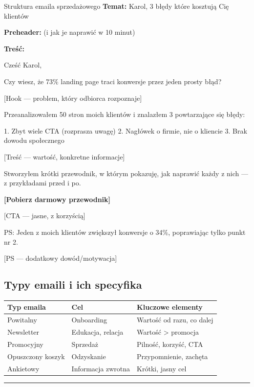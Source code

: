 \documentclass[
  12pt,
  a4paper,
  twoside,
  openright,
  12pt,
  DIV=12,
  BCOR=12mm]{scrbook}
\newcommand{\decoline}{%
  \begin{center}
    \textcolor{bordergray}{\rule{0.3\textwidth}{0.5pt}}
  \end{center}
}
\begin{document}
\begin{przyklad}{Struktura emaila sprzedażowego}
\textbf{Temat:} Karol, 3 błędy które kosztują Cię klientów

\textbf{Preheader:} (i jak je naprawić w 10 minut)

\textbf{Treść:}

Cześć Karol,

Czy wiesz, że 73\% landing page traci konwersje przez jeden prosty błąd?

[Hook --- problem, który odbiorca rozpoznaje]

Przeanalizowałem 50 stron moich klientów i znalazłem 3 powtarzające się błędy:

1. Zbyt wiele CTA (rozprasza uwagę)
2. Nagłówek o firmie, nie o kliencie
3. Brak dowodu społecznego

[Treść --- wartość, konkretne informacje]

Stworzyłem krótki przewodnik, w którym pokazuję, jak naprawić każdy z nich --- z przykładami przed i po.

\textbf{[Pobierz darmowy przewodnik]}

[CTA --- jasne, z korzyścią]

PS: Jeden z moich klientów zwiększył konwersje o 34\%, poprawiając tylko punkt nr 2.

[PS --- dodatkowy dowód/motywacja]
\end{przyklad}

\subsection{Typy emaili i ich
specyfika}\label{typy-emaili-i-ich-specyfika}

\begin{longtable}[]{@{}lll@{}}
\toprule\noalign{}
Typ emaila & Cel & Kluczowe elementy \\
\midrule\noalign{}
\endhead
\bottomrule\noalign{}
\endlastfoot
Powitalny & Onboarding & Wartość od razu, co dalej \\
Newsletter & Edukacja, relacja & Wartość \textgreater{} promocja \\
Promocyjny & Sprzedaż & Pilność, korzyść, CTA \\
Opuszczony koszyk & Odzyskanie & Przypomnienie, zachęta \\
Ankietowy & Informacja zwrotna & Krótki, jasny cel \\
\end{longtable}

\decoline
\end{document}
